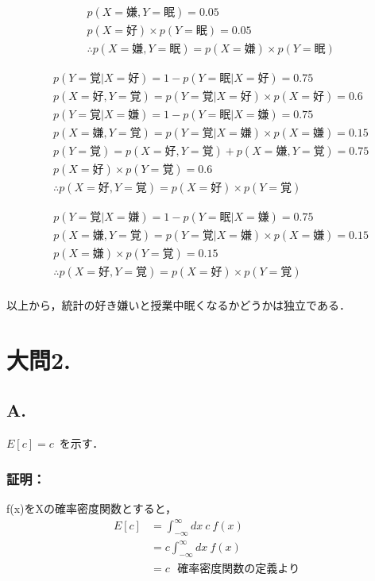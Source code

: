 \documentclass[fleqn]{jsarticle}
\begin{document}
  \begin{equation*}
    \begin{aligned}
      &p(X=嫌, Y=眠) = 0.05\\
      &p(X=好) \times p(Y=眠) = 0.05\\
      &\therefore p(X=嫌, Y=眠) = p(X=嫌) \times p(Y=眠)
    \end{aligned}
  \end{equation*}

  \begin{equation*}
    \begin{aligned}
      &p(Y=覚|X=好) = 1 - p(Y=眠|X=好) = 0.75\\
      &p(X=好, Y=覚) = p(Y=覚|X=好) \times p(X=好) = 0.6\\
      &p(Y=覚|X=嫌) = 1 - p(Y=眠|X=嫌) = 0.75\\
      &p(X=嫌, Y=覚) = p(Y=覚|X=嫌) \times p(X=嫌) = 0.15\\
      &p(Y=覚) = p(X=好, Y=覚) + p(X=嫌, Y=覚) = 0.75\\
      &p(X=好) \times p(Y=覚) = 0.6\\
      &\therefore p(X=好, Y=覚) = p(X=好) \times p(Y=覚)
    \end{aligned}
  \end{equation*}

  \begin{equation*}
    \begin{aligned}
      &p(Y=覚|X=嫌) = 1 - p(Y=眠|X=嫌) = 0.75\\
      &p(X=嫌, Y=覚) = p(Y=覚|X=嫌) \times p(X=嫌) = 0.15\\
      &p(X=嫌) \times p(Y=覚) = 0.15\\
      &\therefore p(X=好, Y=覚) = p(X=好) \times p(Y=覚)
    \end{aligned}
  \end{equation*}
  \\
  以上から，統計の好き嫌いと授業中眠くなるかどうかは独立である．


\section*{大問2.}
\subsection*{A.}
  $E[c] = c$\ を示す．

  \subsubsection*{証明：}
    \noindent f(x)をXの確率密度関数とすると，
    \begin{equation*}
      \begin{aligned}
        E[c] &= \int_{-\infty}^{\infty} dx\ c\ f(x)\\
        &= c \int_{-\infty}^{\infty} dx\ f(x)\\
        &= c\ \ \ 確率密度関数の定義より
      \end{aligned}
    \end{equation*}
\end{document}
